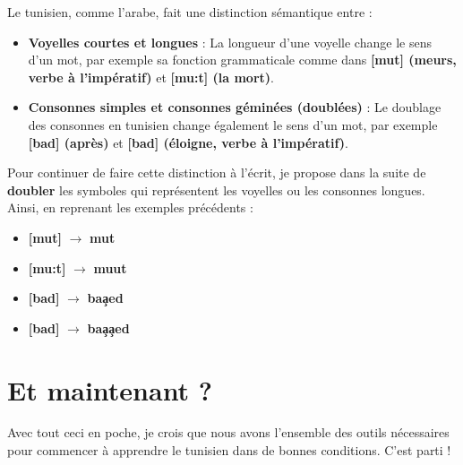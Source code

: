 Le tunisien, comme l'arabe, fait une distinction sémantique entre :
\begin{itemize}
    \item \textbf{Voyelles courtes et longues} : La longueur d'une voyelle change le sens d'un mot, par exemple sa fonction grammaticale comme dans \textbf{[mut] (meurs, verbe à l'impératif)} et \textbf{[mu:t] (la mort)}.
    \item \textbf{Consonnes simples et consonnes géminées (doublées)} : Le doublage des consonnes en tunisien change également le sens d'un mot, par exemple \textbf{[ba\textrevglotstop \textschwa d] (après)} et \textbf{[ba\textrevglotstop\textrevglotstop \textschwa d] (éloigne, verbe à l'impératif)}.
\end{itemize}

Pour continuer de faire cette distinction à l'écrit, je propose dans la suite de \textbf{doubler} les symboles qui représentent les voyelles ou les consonnes longues. Ainsi, en reprenant les exemples précédents : 

\begin{itemize}
    \item \textbf{[mut]} $\rightarrow$ \textbf{mut}
    \item \textbf{[mu:t]} $\rightarrow$ \textbf{muut}
    \item \textbf{[ba\textrevglotstop \textschwa d]} $\rightarrow$ \textbf{ba\c{a}ed}
    \item \textbf{[ba\textrevglotstop\textrevglotstop \textschwa d]} $\rightarrow$ \textbf{ba\c{a}\c{a}ed}
\end{itemize}

\section{Et maintenant ? }
Avec tout ceci en poche, je crois que nous avons l'ensemble des outils nécessaires pour commencer à apprendre le tunisien dans de bonnes conditions. C'est parti !
